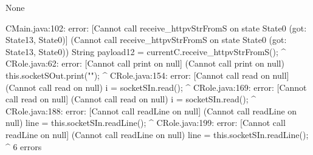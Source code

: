 \lstset{language=,caption=Original Mungo output}
\begin{code}
None
\end{code}

\lstset{language=,caption=New Mungo output}
\begin{code}
CMain.java:102: error: [Cannot call receive_httpvStrFromS on state State0 (got: State13, State0)] (Cannot call receive_httpvStrFromS on state State0 (got: State13, State0))
        String payload12 = currentC.receive_httpvStrFromS();
                                                         ^
CRole.java:62: error: [Cannot call print on null] (Cannot call print on null)
        this.socketSOut.print("");
                             ^
CRole.java:154: error: [Cannot call read on null] (Cannot call read on null)
                i = socketSIn.read();
                                  ^
CRole.java:169: error: [Cannot call read on null] (Cannot call read on null)
				i = socketSIn.read();
				                  ^
CRole.java:188: error: [Cannot call readLine on null] (Cannot call readLine on null)
            line = this.socketSIn.readLine();
                                          ^
CRole.java:199: error: [Cannot call readLine on null] (Cannot call readLine on null)
            line = this.socketSIn.readLine();
                                          ^
6 errors
\end{code}

